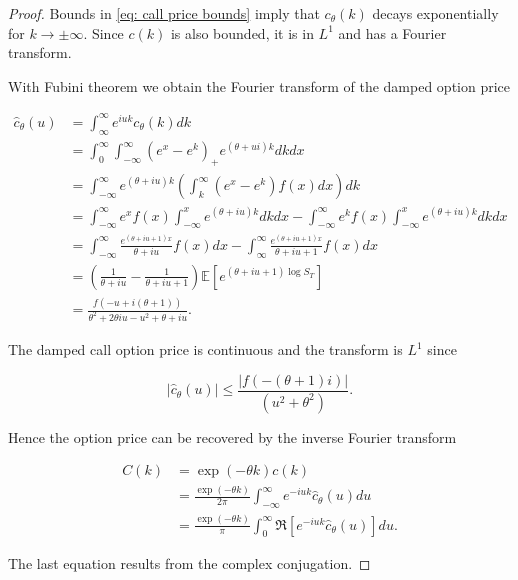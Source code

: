 \documentclass[12pt,twoside]{article}
\theoremstyle{plain}
\theoremstyle{plain}
\theoremstyle{definition}
\theoremstyle{remark}
\numberwithin{equation}{section}
\begin{document}
\begin{proof}

Bounds in \eqref{eq: call price bounds} imply that $c_\theta(k)$ decays exponentially for $k\rightarrow \pm \infty$. Since $c(k)$ is also bounded, it is in $L^1$ and has a Fourier transform.

With Fubini theorem we obtain the Fourier transform of the damped option price

\begin{equation}
\label{eq: fourier call calculation}
\begin{aligned}
\hat c_{\theta} (u) &= \int _{\infty} ^\infty e ^ {iuk} c _\theta(k) dk \\[5pt]
&= \int _{0} ^\infty \int _{-\infty} ^\infty (e^x-e^k)_+ e^{(\theta + ui)k}  dk dx \\[5pt]
&= \int _{-\infty} ^\infty e^{(\theta + iu)k} \left( \int_k^\infty(e^x-e^k) f(x)dx\right)dk\\[5pt]
&= \int _{-\infty} ^\infty e^x f(x) \int _{-\infty} ^x e^{(\theta + iu) k} dk dx - \int _{-\infty} ^\infty e^k f(x) \int _{-\infty} ^x e^{(\theta + iu) k} dk dx \\[5pt]
&= \int _{-\infty} ^\infty \frac{e^{(\theta + iu +1 )x}}{\theta + iu} f(x) dx - \int _{\infty} ^\infty \frac{e^{(\theta + iu +1 )x}}{\theta + iu + 1} f(x) dx \\[5pt]
&= \left(\frac{1}{\theta + iu} - \frac{1}{\theta + iu + 1} \right) \mathbb E \left[e^{(\theta + iu + 1)\log S_T} \right] \\[5pt]
&= \frac{f(-u +i (\theta + 1))}{\theta ^ 2 + 2\theta iu - u^2 + \theta+ iu}.
\end{aligned}
\end{equation}


The damped call option price is continuous and the transform is $L^1$ since

$$
|\hat c _\theta(u)| \leq \frac{\left|f\left(-\left(\theta+1\right) i\right)\right|} {\left(u^{2}+\theta^{2}\right)}.
$$

Hence the option price can be recovered by the inverse Fourier transform

$$
\begin{aligned}
C(k) &= \exp(-\theta k) c(k) \\[10pt]
&= \frac{\exp(-\theta k) }{2 \pi} \int_{-\infty}^\infty e^{-iuk} \hat c _\theta (u) du  \\[10pt]
&= \frac{\exp(-\theta k) }{\pi} \int_0^\infty \Re \left[ e^{-iuk} \hat c _\theta (u) \right] du.
\end{aligned}
$$

The last equation results from the complex conjugation.

\end{proof}
\end{document}
